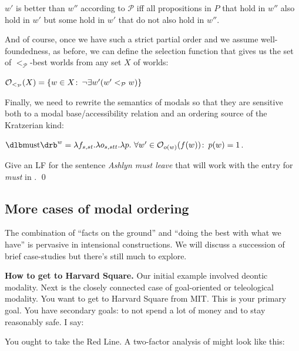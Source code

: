 $w'$ is better than $w''$ according to $\mathcal{P}$ iff all propositions in $P$
that hold in $w''$ also hold in $w'$ but some hold in $w'$ that do not also hold
in $w''$.
\xe

And of course, once we have such a strict partial order and we assume
well-foundedness, as before, we can define the selection function that gives us
the set of $<_{\mathcal{P}}$-best worlds from any set $X$ of worlds:

\ex
$\opt_{<_{\mathcal{P}}}(X) = \{w\in X\co \neg\exists w'(w'<_{\mathcal{P}} w)\}$
\xe

Finally, we need to rewrite the semantics of modals so that they are sensitive
both to a modal base/accessibility relation and an ordering source of the
Kratzerian kind:

\ex\label{ex:modal-2}
$\svt{must}^w = \lambda f_{s,st}.\lambda o_{s,stt}.\lambda p.\ \forall
w'\in\opt_{o(w)}(f(w))\co p(w)=1$.
\xe

\begin{exercise}
  Give an LF for the sentence \emph{Ashlyn must leave} that will work with the
  entry for \emph{must} in \Last. \qed
\end{exercise}

\subsection{More cases of modal ordering}
\label{subsec:more-ordering}

The combination of ``facts on the ground'' and ``doing the best with what we
have'' is pervasive in intensional constructions. We will discuss a succession
of brief case-studies but there's still much to explore.

\medskip

\textbf{How to get to Harvard Square.} Our initial example involved deontic modality. Next is the closely connected
case of goal-oriented or teleological modality. You want to get to Harvard
Square from MIT. This is your primary goal. You have secondary goals: to not
spend a lot of money and to stay reasonably safe. I say:

\ex You ought to take the Red Line. \xe
%
%
A two-factor analysis of \Last might look like this:

